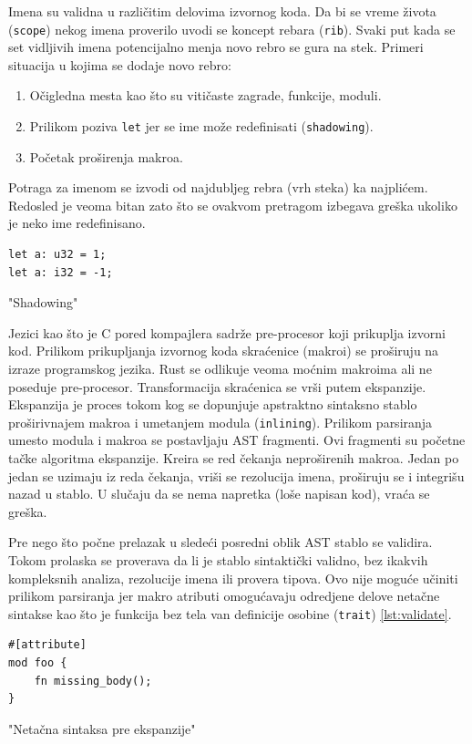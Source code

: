 \documentclass[11pt]{article}
\begin{document}
Imena su validna u različitim delovima izvornog koda. Da bi se 
vreme života (\verb|scope|) nekog imena proverilo uvodi se koncept rebara (\verb|rib|). Svaki put kada se 
set vidljivih imena potencijalno menja novo rebro se gura na stek. Primeri situacija u kojima se dodaje 
novo rebro:
\begin{enumerate}
    \item Očigledna mesta kao što su vitičaste zagrade, funkcije, moduli.
    \item Prilikom poziva \verb|let| jer se ime može redefinisati (\verb|shadowing|).
    \item Početak proširenja makroa. 
\end{enumerate}
Potraga za imenom se izvodi od najdubljeg rebra (vrh steka) ka najplićem. 
Redosled je veoma bitan zato što se ovakvom pretragom izbegava greška 
ukoliko je neko ime redefinisano.

\begin{listing}[H]
\begin{verbatim}
let a: u32 = 1;
let a: i32 = -1;
\end{verbatim}
\caption{"Shadowing"}
\label{lst:shadowing}
\end{listing}
\newpage

Jezici kao što je C pored kompajlera sadrže pre-procesor koji prikuplja izvorni kod. 
Prilikom prikupljanja izvornog koda skraćenice (makroi) se proširuju na izraze programskog jezika. 
Rust se odlikuje veoma moćnim makroima ali ne poseduje pre-procesor. Transformacija skraćenica se vrši 
putem ekspanzije.  Ekspanzija je proces tokom kog se dopunjuje apstraktno sintaksno stablo
proširivnajem makroa i umetanjem modula (\verb|inlining|). Prilikom parsiranja umesto 
modula i makroa se postavljaju AST fragmenti. Ovi fragmenti su početne tačke algoritma ekspanzije.
Kreira se red čekanja neproširenih makroa. Jedan po jedan se uzimaju iz reda čekanja, vriši se rezolucija imena,
proširuju se i integrišu nazad u stablo. U slučaju da se nema napretka (loše napisan kod), vraća se greška.

Pre nego što počne prelazak u sledeći posredni oblik AST stablo se validira. 
Tokom prolaska se proverava da li je stablo sintaktički validno, bez ikakvih kompleksnih analiza,
rezolucije imena ili provera tipova. Ovo nije moguće učiniti prilikom parsiranja jer makro atributi 
omogućavaju odredjene delove netačne sintakse kao što je funkcija bez tela van definicije osobine (\verb|trait|) \ref{lst:validate}.

\begin{listing}[H]
\begin{verbatim}
#[attribute]
mod foo {
    fn missing_body();
}
\end{verbatim}
\caption{"Netačna sintaksa pre ekspanzije"}
\label{lst:validate}
\end{listing}
\end{document}
